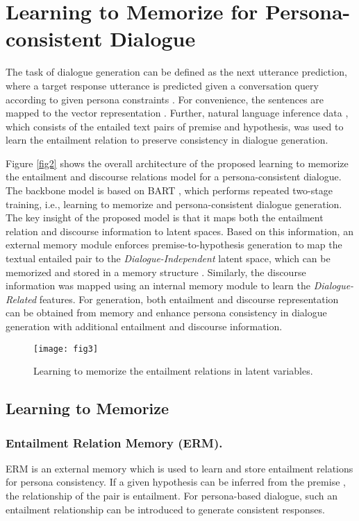 \documentclass[letterpaper]{article} \usepackage{aaai23}  \usepackage{times}  \usepackage{helvet}  \usepackage{courier}  \usepackage[hyphens]{url}  \usepackage{graphicx} \urlstyle{rm} \def\UrlFont{\rm}  \usepackage{natbib}  \usepackage{caption} \frenchspacing  \setlength{\pdfpagewidth}{8.5in}  \setlength{\pdfpageheight}{11in}  \usepackage{algorithm}
\begin{document}
\section{Learning to Memorize for Persona-consistent Dialogue}
The task of dialogue generation can be defined as the next utterance prediction, where a target response utterance  is predicted given a conversation query  according to given persona constraints . For convenience, the sentences  are mapped to the vector representation . Further, natural language inference data \cite{Welleck2020,Williams2018} , which consists of the entailed text pairs of premise and hypothesis, was used to learn the entailment relation to preserve consistency in dialogue generation.

Figure \ref{fig2} shows the overall architecture of the proposed learning to memorize the entailment and discourse relations model for a persona-consistent dialogue. The backbone model is based on BART \cite{Lewis2020}, which performs repeated two-stage  training, i.e., learning to memorize and persona-consistent dialogue generation. The key insight of the proposed model is that it maps both the entailment relation and discourse information to latent spaces. Based on this information, an external memory module enforces premise-to-hypothesis generation to map the textual entailed pair to the \textit{Dialogue-Independent} latent space, which can be memorized and stored in a memory structure . Similarly, the discourse information was mapped using an internal memory module  to learn the \textit{Dialogue-Related} features. For generation, both entailment and discourse representation can be obtained from memory and enhance persona consistency in dialogue generation with additional entailment and discourse information.

\begin{figure*}[t]
\centering
\texttt{[image: fig3]} \caption{Learning to memorize the entailment relations in latent variables.}
\label{fig3}
\end{figure*}
\subsection{Learning to Memorize}
\subsubsection{Entailment Relation Memory (ERM).}
ERM is an external memory which is used to learn and store entailment relations for persona consistency. If a given hypothesis  can be inferred from the premise , the relationship of the pair is entailment. For persona-based dialogue, such an entailment relationship can be introduced to generate consistent responses. 
\end{document}
